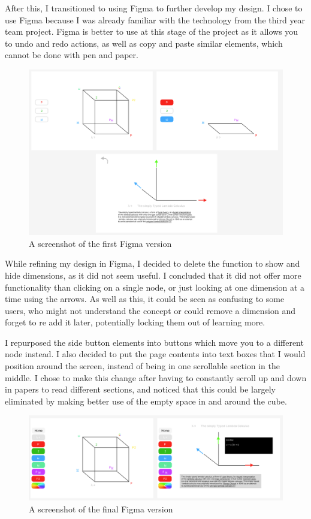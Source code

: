 \documentclass{l4proj}
\begin{document}
After this, I transitioned to using Figma to further develop my design.  I chose to use Figma because I was already familiar with the technology from the third year team project.  Figma is better to use at this stage of the project as it allows you to undo and redo actions, as well as copy and paste similar elements, which cannot be done with pen and paper.

\begin{figure}[h!]
    \centering
    \includegraphics[width=1\linewidth]{dissertation/images/v1_full_taller.png}
    \caption{A screenshot of the first Figma version}
    \label{fig:enter-label}
\end{figure}

While refining my design in Figma, I decided to delete the function to show and hide dimensions, as it did not seem useful.  I concluded that it did not offer more functionality than clicking on a single node, or just looking at one dimension at a time using the arrows.  As well as this, it could be seen as confusing to some users, who might not understand the concept or could remove a dimension and forget to re add it later, potentially locking them out of learning more.

I repurposed the side button elements into buttons which move you to a different node instead.  I also decided to put the page contents into text boxes that I would position around the screen, instead of being in one scrollable section in the middle.  I chose to make this change after having to constantly scroll up and down in papers to read different sections, and noticed that this could be largely eliminated by making better use of the empty space in and around the cube.

\begin{figure}[h!]
    \centering
    \includegraphics[width=1\linewidth]{dissertation/images/v2_full.png}
    \caption{A screenshot of the final Figma version}
    \label{fig:enter-label}
\end{figure}
\end{document}
